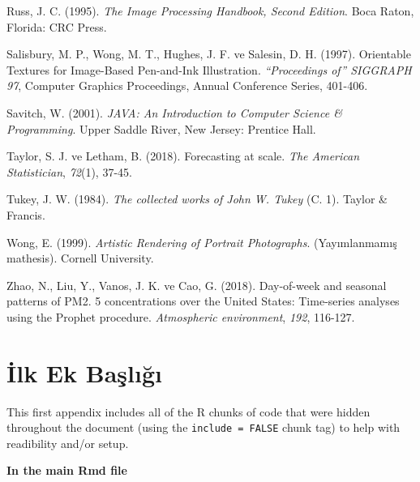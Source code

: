 \documentclass[12pt,twoside]{deuthesis}
\begin{document}
\begin{CSLReferences}{1}{0}
\leavevmode{}%
Russ, J. C. (1995). \emph{{The Image Processing Handbook, Second Edition}}. Boca Raton, Florida: CRC Press.

\leavevmode{}%
Salisbury, M. P., Wong, M. T., Hughes, J. F. ve Salesin, D. H. (1997). Orientable Textures for Image-Based Pen-and-Ink Illustration. \emph{{``Proceedings of''} SIGGRAPH 97}, Computer Graphics Proceedings, Annual Conference Series, 401-406.

\leavevmode{}%
Savitch, W. (2001). \emph{JAVA: An Introduction to Computer Science \& Programming}. Upper Saddle River, New Jersey: Prentice Hall.

\leavevmode{}%
Taylor, S. J. ve Letham, B. (2018). Forecasting at scale. \emph{The American Statistician}, \emph{72}(1), 37-45.

\leavevmode{}%
Tukey, J. W. (1984). \emph{The collected works of John W. Tukey} (C. 1). Taylor \& Francis.

\leavevmode{}%
Wong, E. (1999). \emph{{Artistic Rendering of Portrait Photographs}}. (Yayımlanmamış mathesis). Cornell University.

\leavevmode{}%
Zhao, N., Liu, Y., Vanos, J. K. ve Cao, G. (2018). Day-of-week and seasonal patterns of PM2. 5 concentrations over the United States: Time-series analyses using the Prophet procedure. \emph{Atmospheric environment}, \emph{192}, 116-127.

\end{CSLReferences}

\setlength{\parindent}{-0.20in}
\setlength{\leftskip}{0.20in}
\setlength{\parskip}{8pt}

\appendix

\hypertarget{ilk-ek-baux15flux131ux11fux131}{%
\chapter{İlk Ek Başlığı}\label{ilk-ek-baux15flux131ux11fux131}}

This first appendix includes all of the R chunks of code that were hidden throughout the document (using the \texttt{include\ =\ FALSE} chunk tag) to help with readibility and/or setup.

\textbf{In the main Rmd file}
\end{document}
